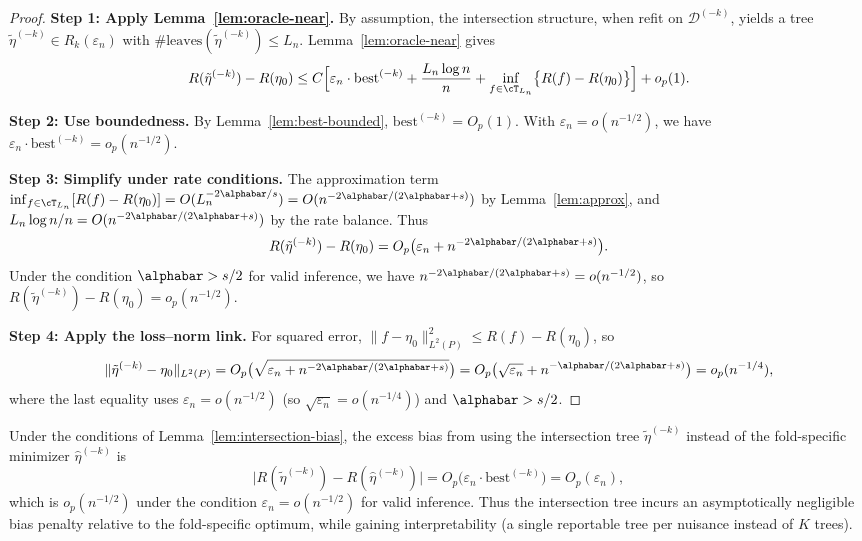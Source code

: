 \documentclass[12pt]{article}
\begin{document}
\begin{proof}
\noindent\textbf{Step 1: Apply Lemma~\ref{lem:oracle-near}.}
By assumption, the intersection structure, when refit on $\mathcal{D}^{(-k)}$, yields a tree $\tilde{\eta}^{(-k)} \in R_k(\varepsilon_n)$ with $\#\text{leaves}(\tilde{\eta}^{(-k)}) \le L_n$. Lemma~\ref{lem:oracle-near} gives
\[
R(\tilde{\eta}^{(-k)}) - R(\eta_0) \le C \Bigl[ \varepsilon_n \cdot \text{best}^{(-k)} + \frac{L_n \log n}{n} + \inf_{f \in \cT_{L_n}} \bigl\{ R(f) - R(\eta_0) \bigr\} \Bigr] + o_p(1).
\]

\noindent\textbf{Step 2: Use boundedness.}
By Lemma~\ref{lem:best-bounded}, $\text{best}^{(-k)} = O_p(1)$. With $\varepsilon_n = o(n^{-1/2})$, we have $\varepsilon_n \cdot \text{best}^{(-k)} = o_p(n^{-1/2})$.

\noindent\textbf{Step 3: Simplify under rate conditions.}
The approximation term $\inf_{f \in \cT_{L_n}}[R(f) - R(\eta_0)] = O(L_n^{-2\alphabar/s}) = O(n^{-2\alphabar/(2\alphabar+s)})$ by Lemma~\ref{lem:approx}, and $L_n \log n / n = O(n^{-2\alphabar/(2\alphabar+s)})$ by the rate balance. Thus
\[
R(\tilde{\eta}^{(-k)}) - R(\eta_0) = O_p\bigl( \varepsilon_n + n^{-2\alphabar/(2\alphabar+s)} \bigr).
\]
Under the condition $\alphabar > s/2$ for valid inference, we have $n^{-2\alphabar/(2\alphabar+s)} = o(n^{-1/2})$, so $R(\tilde{\eta}^{(-k)}) - R(\eta_0) = o_p(n^{-1/2})$.

\noindent\textbf{Step 4: Apply the loss--norm link.}
For squared error, $\|f - \eta_0\|_{L^2(P)}^2 \le R(f) - R(\eta_0)$, so
\[
\|\tilde{\eta}^{(-k)} - \eta_0\|_{L^2(P)} = O_p\bigl( \sqrt{\varepsilon_n + n^{-2\alphabar/(2\alphabar+s)}} \bigr) = O_p\bigl( \sqrt{\varepsilon_n} + n^{-\alphabar/(2\alphabar+s)} \bigr) = o_p(n^{-1/4}),
\]
where the last equality uses $\varepsilon_n = o(n^{-1/2})$ (so $\sqrt{\varepsilon_n} = o(n^{-1/4})$) and $\alphabar > s/2$.
\end{proof}

\begin{corollary}
\label{cor:intersection-overhead}
Under the conditions of Lemma~\ref{lem:intersection-bias}, the excess bias from using the intersection tree $\tilde{\eta}^{(-k)}$ instead of the fold-specific minimizer $\hat\eta^{(-k)}$ is
\[
\bigl| R(\tilde{\eta}^{(-k)}) - R(\hat\eta^{(-k)}) \bigr| = O_p\bigl( \varepsilon_n \cdot \text{best}^{(-k)} \bigr) = O_p(\varepsilon_n),
\]
which is $o_p(n^{-1/2})$ under the condition $\varepsilon_n = o(n^{-1/2})$ for valid inference. Thus the intersection tree incurs an asymptotically negligible bias penalty relative to the fold-specific optimum, while gaining interpretability (a single reportable tree per nuisance instead of $K$ trees).
\end{corollary}
\end{document}
